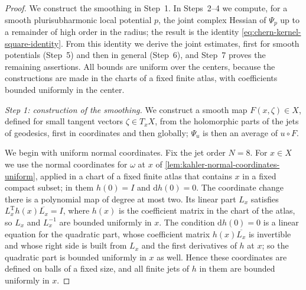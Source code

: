 \begin{proof}
We construct the smoothing in Step~1. In Steps~2--4 we compute, for a smooth plurisubharmonic local potential $p$, the joint complex Hessian of $\Psi_p$ up to a remainder of high order in the radius; the result is the identity \eqref{eq:chern-kernel-square-identity}. From this identity we derive the joint estimates, first for smooth potentials (Step~5) and then in general (Step~6), and Step~7 proves the remaining assertions. All bounds are uniform over the centers, because the constructions are made in the charts of a fixed finite atlas, with coefficients bounded uniformly in the center.

\emph{Step 1: construction of the smoothing.} We construct a smooth map $F(x,\zeta)\in X$, defined for small tangent vectors $\zeta\in T_xX$, from the holomorphic parts of the jets of geodesics, first in coordinates and then globally; $\Psi_u$ is then an average of $u\circ F$.

We begin with uniform normal coordinates. Fix the jet order $N=8$. For $x\in X$ we use the normal coordinates for $\omega$ at $x$ of \cref{lem:kahler-normal-coordinates-uniform}, applied in a chart of a fixed finite atlas that contains $x$ in a fixed compact subset; in them $h(0)=I$ and $\mathrm dh(0)=0$. The coordinate change there is a polynomial map of degree at most two. Its linear part $L_x$ satisfies $L_x^{\mathrm T}h(x)\overline{L_x}=I$, where $h(x)$ is the coefficient matrix in the chart of the atlas, so $L_x$ and $L_x^{-1}$ are bounded uniformly in $x$. The condition $\mathrm dh(0)=0$ is a linear equation for the quadratic part, whose coefficient matrix $h(x)\overline{L_x}$ is invertible and whose right side is built from $L_x$ and the first derivatives of $h$ at $x$; so the quadratic part is bounded uniformly in $x$ as well. Hence these coordinates are defined on balls of a fixed size, and all finite jets of $h$ in them are bounded uniformly in $x$.


\end{proof}

